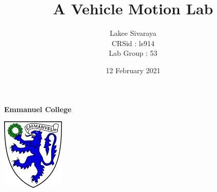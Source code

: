 \documentclass{article}
\title{\textbf{\fontsize{26}{12}\selectfont \Romannum{1}A Vehicle Motion Lab}}
\author{{\LARGE Lakee Sivaraya}\\[0.2in] CRSid : ls914\\[0.1in] Lab Group : 53}
\date{12 February 2021}
\begin{document}
\begin{titlepage}
\maketitle
    \centering
    \vfill
    {\bfseries\Large
     Emmanuel College\vspace{0.4in}
    }    
    
    \includegraphics[width=3cm]{Emmanuel.pdf} 
    \vfill
    \vfill
    \thispagestyle{empty}

\end{titlepage}
\newpage
\end{document}
